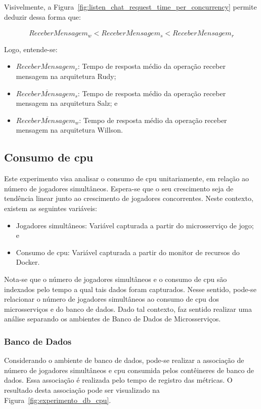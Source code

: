 Visivelmente, a Figura~\ref{fig:listen_chat_request_time_per_concurrency} permite deduzir dessa forma que:

$$
  \overline{ReceberMensagem_{w}} < \overline{ReceberMensagem_{s}} <\overline{ReceberMensagem_{r}}
$$

Logo, entende-se:

\begin{itemize}
 \item $\overline{ReceberMensagem_{r}}$: Tempo de resposta médio da operação receber mensagem na arquitetura Rudy;
 \item $\overline{ReceberMensagem_{s}}$: Tempo de resposta médio da operação receber mensagem na arquitetura Salz; e
 \item $\overline{ReceberMensagem_{w}}$: Tempo de resposta médio da operação receber mensagem na arquitetura Willson.
\end{itemize}

\subsection{Consumo de \ac{cpu}}

Este experimento visa analisar o consumo de \ac{cpu} unitariamente, em relação ao número de jogadores simultâneos.
%
Espera-se que o seu crescimento seja de tendência linear junto ao crescimento de jogadores concorrentes.
%
Neste contexto, existem as seguintes variáveis:

\begin{itemize}
    \item Jogadores simultâneos: Variável capturada a partir do microsserviço de jogo; e
    \item Consumo de \ac{cpu}: Variável capturada a partir do monitor de recursos do Docker.
\end{itemize}

Nota-se que o número de jogadores simultâneos e o consumo de \ac{cpu} são indexados pelo tempo a qual tais dados foram capturados.
%
Nesse sentido, pode-se relacionar o número de jogadores simultâneos ao consumo de \ac{cpu} dos microsserviços e do banco de dados.
%
Dado tal contexto, faz sentido realizar uma análise separando os ambientes de Banco de Dados de Microsserviços.

\subsubsection{Banco de Dados}

Considerando o ambiente de banco de dados, pode-se realizar a associação de número de jogadores simultâneos e \ac{cpu} consumida pelos contêineres de banco de dados.
%
Essa associação é realizada pelo tempo de registro das métricas.
%
O resultado desta associação pode ser visualizado na Figura~\ref{fig:experimento_db_cpu}.



